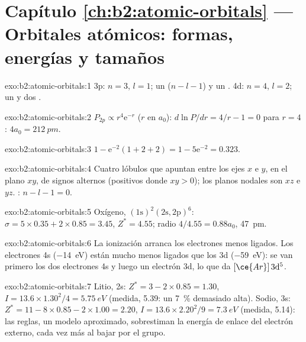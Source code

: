 \section*{Capítulo \ref{ch:b2:atomic-orbitals} --- Orbitales atómicos: formas, energías y tamaños}

\begin{solution}{exo:b2:atomic-orbitals:1}
3p: $n = 3$, $l = 1$; un  ($n - l - 1$) y un . 4d: $n = 4$,
$l = 2$; un  y dos .
\end{solution}

\begin{solution}{exo:b2:atomic-orbitals:2}
$P_{2p} \propto r^4\mathrm e^{-r}$ ($r$ en $a_0$): $d\ln P/dr = 4/r - 1 = 0$ para $r = 4$:
$4a_0 = \qty{212}{pm}$.
\end{solution}

\begin{solution}{exo:b2:atomic-orbitals:3}
$1 - \mathrm e^{-2}(1 + 2 + 2) = 1 - 5\mathrm e^{-2} = 0.323$.
\end{solution}

\begin{solution}{exo:b2:atomic-orbitals:4}
Cuatro lóbulos que apuntan entre los ejes $x$ e $y$, en el plano $xy$, de signos
alternos (positivos donde $xy > 0$); los planos nodales son $xz$ e $yz$. :
$n - l - 1 = 0$.
\end{solution}

\begin{solution}{exo:b2:atomic-orbitals:5}
Oxígeno, $(1\mathrm s)^2(2\mathrm s, 2\mathrm p)^6$: $\sigma = 5 \times 0.35 + 2 \times 0.85
= 3.45$, $Z^* = 4.55$; radio $4/4.55 = 0.88a_0$, \qty{47}{pm}.
\end{solution}

\begin{solution}{exo:b2:atomic-orbitals:6}
La ionización arranca los electrones menos ligados. Los electrones 4s
(\qty{-14}{eV}) están mucho menos ligados que los 3d (\qty{-59}{eV}): se van primero los dos
electrones 4s y luego un electrón 3d, lo que da $[\ce{Ar}]\,3\mathrm d^5$.
\end{solution}

\begin{solution}{exo:b2:atomic-orbitals:7}
Litio, 2s: $Z^* = 3 - 2 \times 0.85 = 1.30$, $I = 13.6 \times 1.30^2/4 =
\qty{5.75}{eV}$ (medida, 5.39: un 7~\% demasiado alta). Sodio, 3s: $Z^* = 11 - 8 \times 0.85 -
2 \times 1.00 = 2.20$, $I = 13.6 \times 2.20^2/9 = \qty{7.3}{eV}$ (medida, 5.14): las
reglas, un modelo aproximado, sobrestiman la energía de enlace del electrón externo, cada vez
más al bajar por el grupo.
\end{solution}

